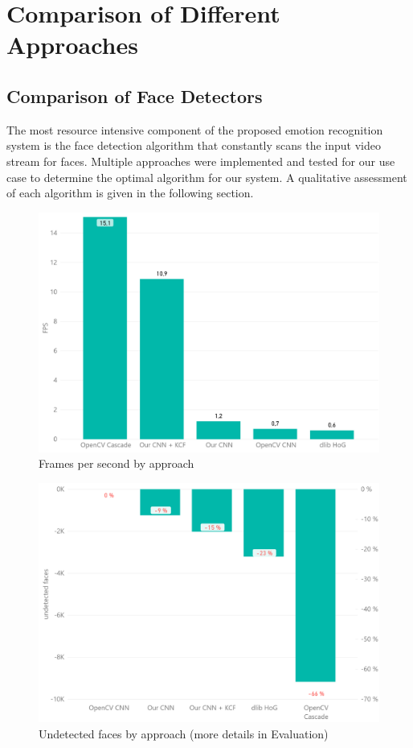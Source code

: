 \chapter{Comparison of Different Approaches}
\section{Comparison of Face Detectors}
The most resource intensive component of the proposed emotion recognition system is the face detection algorithm that constantly scans the input video stream for faces. Multiple approaches were implemented and tested for our use case to determine the optimal algorithm for our system. A qualitative assessment of each algorithm is given in the following section.\\
\begin{minipage}{0.49\textwidth}
\begin{figure}[H]
  \centering
  \includegraphics[width=\columnwidth]{media/diagram_FPS.png}
  \caption{Frames per second by approach}
\end{figure}
\end{minipage} \hfill
\begin{minipage}{0.49\textwidth}
\begin{figure}[H]
  \centering
  \includegraphics[width=\columnwidth]{media/diagram_accuracy.png}
  \caption{Undetected faces by approach (more details in Evaluation)}
\end{figure}
\end{minipage}
